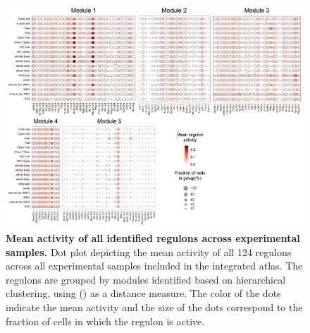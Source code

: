 




\begin{figure}[H]
\centering
\includegraphics[width=\linewidth]{Appendix2/Fig/F3-15-01.png}
\caption[Mean activity of all identified regulons across experimental samples]{\textbf{Mean activity of all identified regulons across experimental samples.} Dot plot depicting the mean activity of all 124 regulons across all experimental samples included in the integrated atlas. The regulons are grouped by modules identified based on hierarchical clustering, using  () as a distance measure. The color of the dots indicate the mean activity and the size of the dots correspond to the fraction of cells in which the regulon is active.}
\label{fig:app_chp3_scenic_studies}
\end{figure}

